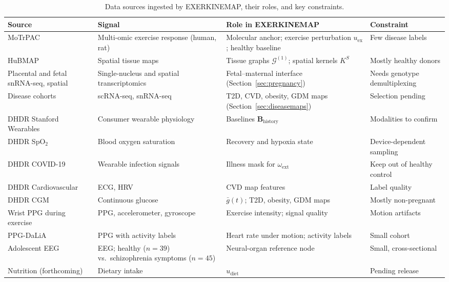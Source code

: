 \documentclass[11pt]{article}
\begin{document}
\begin{table}[htpb]
\caption{Data sources ingested by EXERKINEMAP, their roles, and key constraints.}
\centering
\renewcommand{\arraystretch}{1.4}
\small
\begin{tabularx}{\textwidth}{@{} >{\raggedright\arraybackslash}p{3.3cm} >{\raggedright\arraybackslash}p{3.3cm} >{\raggedright\arraybackslash}X >{\raggedright\arraybackslash}p{3.4cm} @{}}
\toprule
\textbf{Source} & \textbf{Signal} & \textbf{Role in EXERKINEMAP} & \textbf{Constraint} \\
\midrule
MoTrPAC & Multi-omic exercise response (human, rat) & Molecular anchor; exercise perturbation $u_{\text{ex}}$; healthy baseline & Few disease labels \\
HuBMAP & Spatial tissue maps & Tissue graphs $\mathcal{G}^{(1)}$; spatial kernels $K^S$ & Mostly healthy donors \\
Placental and fetal snRNA-seq, spatial & Single-nucleus and spatial transcriptomics & Fetal--maternal interface (Section~\ref{sec:pregnancy}) & Needs genotype demultiplexing \\
Disease cohorts & scRNA-seq, snRNA-seq & T2D, CVD, obesity, GDM maps (Section~\ref{sec:diseasemaps}) & Selection pending \\
DHDR Stanford Wearables & Consumer wearable physiology & Baselines $\mathbf{B}_{\text{history}}$ & Modalities to confirm \\
DHDR SpO$_2$ & Blood oxygen saturation & Recovery and hypoxia state & Device-dependent sampling \\
DHDR COVID-19 & Wearable infection signals & Illness mask for $\omega_{\text{ext}}$ & Keep out of healthy control \\
DHDR Cardiovascular & ECG, HRV & CVD map features & Label quality \\
DHDR CGM & Continuous glucose & $\bar{g}(t)$; T2D, obesity, GDM maps & Mostly non-pregnant \\
Wrist PPG during exercise \cite{jarchi2017,goldberger2000} & PPG, accelerometer, gyroscope & Exercise intensity; signal quality & Motion artifacts \\
PPG-DaLiA & PPG with activity labels & Heart rate under motion; activity labels & Small cohort \\
Adolescent EEG & EEG; healthy ($n=39$) vs.\ schizophrenia symptoms ($n=45$) & Neural-organ reference node & Small, cross-sectional \\
Nutrition (forthcoming) & Dietary intake & $u_{\text{diet}}$ & Pending release \\
\bottomrule
\end{tabularx}
\label{tab:datasets}
\end{table}
\end{document}
